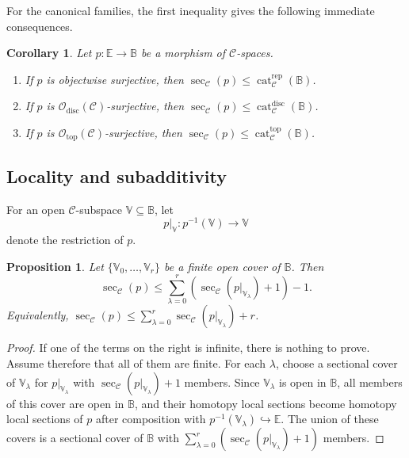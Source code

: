 \documentclass[12pt]{amsart}
\newtheorem{cor}[teo]{Corollary}
\newtheorem{prop}[teo]{Proposition}
\theoremstyle{definition}
\theoremstyle{remark}
\numberwithin{figure}{section}%
\newcommand{\CC}{\mathcal{C}}
\newcommand{\cat}{\mathop{\mathrm{cat}}}
\newcommand{\Vv}{\mathbb{V}}
\newcommand{\Ee}{\mathbb{E}}
\newcommand{\Bb}{\mathbb{B}}
\begin{document}
For the canonical families, the first inequality gives the following
immediate consequences.

\begin{cor}\label{cor:sectional-three-families}
Let $p\colon\Ee\to\Bb$ be a morphism of $\CC$-spaces.
\begin{enumerate}
    \item If $p$ is objectwise surjective, then
    $\sec_{\CC}(p)\leq\cat_{\CC}^{\mathrm{rep}}(\Bb)$.

    \item If $p$ is $\mathcal O_{\mathrm{disc}}(\CC)$-surjective, then
    $\sec_{\CC}(p)\leq\cat_{\CC}^{\mathrm{disc}}(\Bb)$.

    \item If $p$ is $\mathcal O_{\mathrm{top}}(\CC)$-surjective, then
    $\sec_{\CC}(p)\leq\cat_{\CC}^{\mathrm{top}}(\Bb)$.
\end{enumerate}
\end{cor}

\subsection{Locality and subadditivity}

For an open $\CC$-subspace $\Vv\subseteq\Bb$, let
\[
p|_{\Vv}\colon p^{-1}(\Vv)\longrightarrow\Vv
\]
denote the restriction of $p$.

\begin{prop}\label{prop:sectional-subadditivity}
Let $\{\Vv_0,\ldots,\Vv_r\}$ be a finite open cover of $\Bb$. Then
\[
\sec_{\CC}(p)
\leq
\sum_{\lambda=0}^{r}
\left(\sec_{\CC}(p|_{\Vv_\lambda})+1\right)-1.
\]
Equivalently,
$\sec_{\CC}(p)\leq
\sum_{\lambda=0}^{r}\sec_{\CC}(p|_{\Vv_\lambda})+r$.
\end{prop}

\begin{proof}
If one of the terms on the right is infinite, there is nothing to prove.
Assume therefore that all of them are finite. For each $\lambda$, choose a sectional cover of $\Vv_\lambda$ for
$p|_{\Vv_\lambda}$ with
$\sec_{\CC}(p|_{\Vv_\lambda})+1$ members. Since
$\Vv_\lambda$ is open in $\Bb$, all members of this cover are open in
$\Bb$, and their homotopy local sections become homotopy local sections
of $p$ after composition with
$p^{-1}(\Vv_\lambda)\hookrightarrow\Ee$. The union of these covers is a
sectional cover of $\Bb$ with
$\sum_{\lambda=0}^{r}(\sec_{\CC}(p|_{\Vv_\lambda})+1)$ members.
\end{proof}
\end{document}
